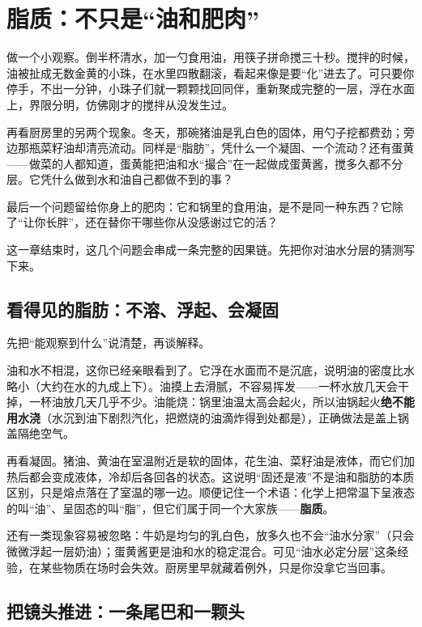 \chapter{脂质：不只是“油和肥肉”}

\begin{kaichang}
做一个小观察。倒半杯清水，加一勺食用油，用筷子拼命搅三十秒。搅拌的时候，油被扯成无数金黄的小珠，在水里四散翻滚，看起来像是要“化”进去了。可只要你停手，不出一分钟，小珠子们就一颗颗找回同伴，重新聚成完整的一层，浮在水面上，界限分明，仿佛刚才的搅拌从没发生过。

再看厨房里的另两个现象。冬天，那碗猪油是乳白色的固体，用勺子挖都费劲；旁边那瓶菜籽油却清亮流动。同样是“脂肪”，凭什么一个凝固、一个流动？还有蛋黄——做菜的人都知道，蛋黄能把油和水“撮合”在一起做成蛋黄酱，搅多久都不分层。它凭什么做到水和油自己都做不到的事？

最后一个问题留给你身上的肥肉：它和锅里的食用油，是不是同一种东西？它除了“让你长胖”，还在替你干哪些你从没感谢过它的活？

这一章结束时，这几个问题会串成一条完整的因果链。先把你对油水分层的猜测写下来。
\end{kaichang}

\section{看得见的脂肪：不溶、浮起、会凝固}

先把“能观察到什么”说清楚，再谈解释。

油和水不相混，这你已经亲眼看到了。它浮在水面而不是沉底，说明油的密度比水略小（大约在水的九成上下）。油摸上去滑腻，不容易挥发——一杯水放几天会干掉，一杯油放几天几乎不少。油能烧：锅里油温太高会起火，所以油锅起火\textbf{绝不能用水浇}（水沉到油下剧烈汽化，把燃烧的油滴炸得到处都是），正确做法是盖上锅盖隔绝空气。

再看凝固。猪油、黄油在室温附近是软的固体，花生油、菜籽油是液体，而它们加热后都会变成液体，冷却后各回各的状态。这说明“固还是液”不是油和脂肪的本质区别，只是熔点落在了室温的哪一边。顺便记住一个术语：化学上把常温下呈液态的叫“油”、呈固态的叫“脂”，但它们属于同一个大家族——\textbf{脂质}。

还有一类现象容易被忽略：牛奶是均匀的乳白色，放多久也不会“油水分家”（只会微微浮起一层奶油）；蛋黄酱更是油和水的稳定混合。可见“油水必定分层”这条经验，在某些物质在场时会失效。厨房里早就藏着例外，只是你没拿它当回事。

\section{把镜头推进：一条尾巴和一颗头}

